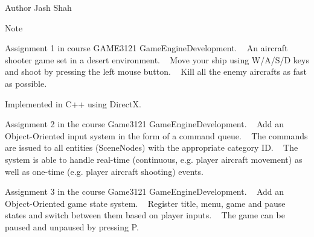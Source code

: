 \begin{DoxyAuthor}{Author}
Jash Shah
\end{DoxyAuthor}
\begin{DoxyNote}{Note}

\end{DoxyNote}
Assignment 1 in course GAME3121 Game\+Engine\+Development. ~\newline
 An aircraft shooter game set in a desert environment. ~\newline
 Move your ship using W/\+A/\+S/D keys and shoot by pressing the left mouse button. ~\newline
 Kill all the enemy aircrafts as fast as possible. ~\newline


Implemented in C++ using DirectX.

Assignment 2 in the course Game3121 Game\+Engine\+Development. ~\newline
 Add an Object-\/\+Oriented input system in the form of a command queue. ~\newline
 The commands are issued to all entities (Scene\+Nodes) with the appropriate category ID. ~\newline
 The system is able to handle real-\/time (continuous, e.\+g. player aircraft movement) as well as one-\/time (e.\+g. player aircraft shooting) events. ~\newline


Assignment 3 in the course Game3121 Game\+Engine\+Development. ~\newline
 Add an Object-\/\+Oriented game state system. ~\newline
 Register title, menu, game and pause states and switch between them based on player inputs. ~\newline
 The game can be paused and unpaused by pressing P. ~\newline
 